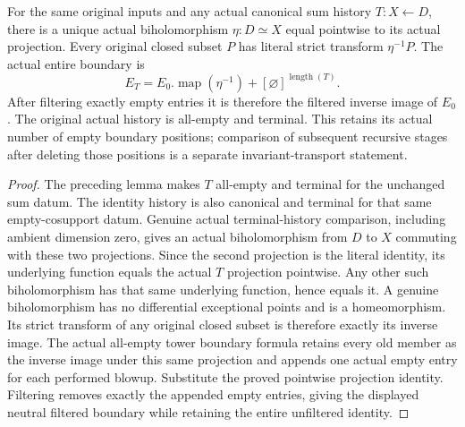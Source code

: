 \begin{theorem}
\label{hir:original-empty-sum-stage-unique-projection-neutrality}
\leanok
For the same original inputs and any actual canonical sum history
$T:X\leftarrow D$, there is a unique actual biholomorphism
$\eta:D\simeq X$ equal pointwise to its actual projection. Every original
closed subset $P$ has literal strict transform $\eta^{-1}P$. The actual
entire boundary is
\[
 E_T=E_0.\operatorname{map}(\eta^{-1})
       \mathbin{+}[\varnothing]^{\operatorname{length}(T)}.
\]
After filtering exactly empty entries it is therefore the filtered
inverse image of $E_0$. The original actual history is all-empty and
terminal. This retains its actual number of empty boundary positions;
comparison of subsequent recursive stages after deleting those positions
is a separate invariant-transport statement.
\end{theorem}
\begin{proof}
The preceding lemma makes $T$ all-empty and terminal for the unchanged
sum datum. The identity history is also canonical and terminal for that
same empty-cosupport datum. Genuine actual terminal-history comparison,
including ambient dimension zero, gives an actual biholomorphism from
$D$ to $X$ commuting with these two projections. Since the second
projection is the literal identity, its underlying function equals the
actual $T$ projection pointwise. Any other such biholomorphism has that
same underlying function, hence equals it.
A genuine biholomorphism has no differential exceptional points and is a
homeomorphism. Its strict transform of any original closed subset is
therefore exactly its inverse image. The actual all-empty tower boundary
formula retains every old member as the inverse image under this same
projection and appends one actual empty entry for each performed blowup.
Substitute the proved pointwise projection identity. Filtering removes
exactly the appended empty entries, giving the displayed neutral
filtered boundary while retaining the entire unfiltered identity.
\end{proof}
